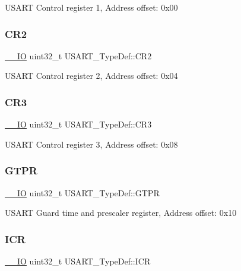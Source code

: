 U\+S\+A\+RT Control register 1, Address offset\+: 0x00 \mbox{\label{struct_u_s_a_r_t___type_def_aa7ede2de6204c3fc4bd9fb328801c99a}} 
\subsubsection{\texorpdfstring{CR2}{CR2}}
{\footnotesize\ttfamily \mbox{\hyperlink{core__sc300_8h_aec43007d9998a0a0e01faede4133d6be}{\+\_\+\+\_\+\+IO}} uint32\+\_\+t U\+S\+A\+R\+T\+\_\+\+Type\+Def\+::\+C\+R2}

U\+S\+A\+RT Control register 2, Address offset\+: 0x04 \mbox{\label{struct_u_s_a_r_t___type_def_af2991da9a4e1539530cd6b7b327199cc}} 
\subsubsection{\texorpdfstring{CR3}{CR3}}
{\footnotesize\ttfamily \mbox{\hyperlink{core__sc300_8h_aec43007d9998a0a0e01faede4133d6be}{\+\_\+\+\_\+\+IO}} uint32\+\_\+t U\+S\+A\+R\+T\+\_\+\+Type\+Def\+::\+C\+R3}

U\+S\+A\+RT Control register 3, Address offset\+: 0x08 \mbox{\label{struct_u_s_a_r_t___type_def_ae23acff49b4ff96fd29093e80fc7d72e}} 
\subsubsection{\texorpdfstring{GTPR}{GTPR}}
{\footnotesize\ttfamily \mbox{\hyperlink{core__sc300_8h_aec43007d9998a0a0e01faede4133d6be}{\+\_\+\+\_\+\+IO}} uint32\+\_\+t U\+S\+A\+R\+T\+\_\+\+Type\+Def\+::\+G\+T\+PR}

U\+S\+A\+RT Guard time and prescaler register, Address offset\+: 0x10 \mbox{\label{struct_u_s_a_r_t___type_def_ab6d6dd2af5463e9e3df458557e09f6cf}} 
\subsubsection{\texorpdfstring{ICR}{ICR}}
{\footnotesize\ttfamily \mbox{\hyperlink{core__sc300_8h_aec43007d9998a0a0e01faede4133d6be}{\+\_\+\+\_\+\+IO}} uint32\+\_\+t U\+S\+A\+R\+T\+\_\+\+Type\+Def\+::\+I\+CR}


